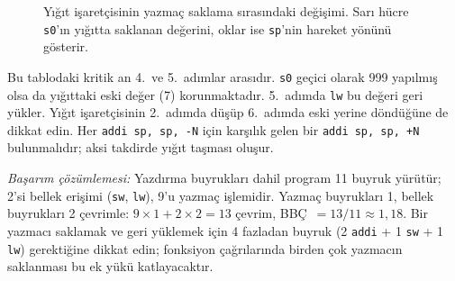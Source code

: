 \begin{ornek}[4.3]
\begin{figure}[H]
\centering
{}
\caption[Yığıt işaretçisinin yazmaç saklama sırasındaki değişimi]{Yığıt işaretçisinin yazmaç saklama sırasındaki değişimi. Sarı hücre \texttt{s0}'ın yığıtta saklanan değerini, oklar ise \texttt{sp}'nin hareket yönünü gösterir.}
\label{fig:yigit-buyume}
\end{figure}

Bu tablodaki kritik an 4.~ve 5.~adımlar arasıdır. \texttt{s0} geçici olarak 999 yapılmış olsa da yığıttaki eski değer (7) korunmaktadır. 5.~adımda \texttt{lw} bu değeri geri yükler. Yığıt işaretçisinin 2.~adımda düşüp 6.~adımda eski yerine döndüğüne de dikkat edin. Her \texttt{addi sp, sp, -N} için karşılık gelen bir \texttt{addi sp, sp, +N} bulunmalıdır; aksi takdirde yığıt taşması oluşur.

\emph{Başarım çözümlemesi:} Yazdırma buyrukları dahil program 11 buyruk yürütür; 2'si bellek erişimi (\texttt{sw}, \texttt{lw}), 9'u yazmaç işlemidir. Yazmaç buyrukları 1, bellek buyrukları 2 çevrimle: $9 \times 1 + 2 \times 2 = 13$ çevrim, BBÇ~$= 13/11 \approx 1{,}18$. Bir yazmacı saklamak ve geri yüklemek için 4 fazladan buyruk (2 \texttt{addi} + 1 \texttt{sw} + 1 \texttt{lw}) gerektiğine dikkat edin; fonksiyon çağrılarında birden çok yazmacın saklanması bu ek yükü katlayacaktır.
\end{ornek}

